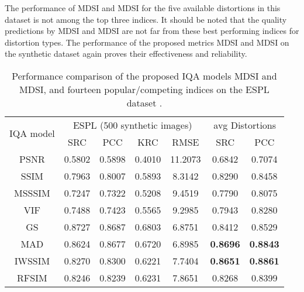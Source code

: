 The performance of MDSI and MDSI for the five available distortions in this dataset is not among the top three indices. It should be noted that the quality predictions by MDSI and MDSI are not far from these best performing indices for distortion types. The performance of the proposed metrics MDSI and MDSI on the synthetic dataset again proves their effectiveness and reliability.  


\begin{table}[htb]
\caption{Performance comparison of the proposed IQA models MDSI and MDSI, and fourteen popular/competing indices on the ESPL dataset \cite{ESPL}.}
\scriptsize
\centering
\begin{tabular}{c|cccc|cc}
\hline
\multirow{2}{*}{IQA model} & \multicolumn{4}{c|}{ESPL (500 synthetic images)}                                & \multicolumn{2}{c}{avg Distortions}                 \\ \cline{2-7} 
                           & SRC             & PCC             & KRC             & RMSE            & SRC             & PCC             \\ \hline
PSNR                       & 0.5802          & 0.5898          & 0.4010          & 11.2073         & 0.6842          & 0.7074          \\
SSIM \cite{SSIM}                       & 0.7963          & 0.8007          & 0.5893          & 8.3142          & 0.8290          & 0.8458          \\
MSSSIM \cite{MSSSIM}                     & 0.7247          & 0.7322          & 0.5208          & 9.4519          & 0.7790          & 0.8075          \\
VIF \cite{VIF}                       & 0.7488          & 0.7423          & 0.5565          & 9.2985          & 0.7943          & 0.8280          \\
GS \cite{GS}                         & 0.8727          & 0.8687          & 0.6803          & 6.8751          & 0.8412          & 0.8529          \\
MAD \cite{MAD}                        & 0.8624          & 0.8677 & 0.6720          & 6.8985          & \textbf{0.8696} & \textbf{0.8843} \\
IWSSIM \cite{IWSSIM}                     & 0.8270          & 0.8300          & 0.6221          & 7.7404          & \textbf{0.8651} & \textbf{0.8861} \\
RFSIM \cite{RFSIM}                      & 0.8246          & 0.8239 & 0.6231          & 7.8651          & 0.8268          & 0.8399 \\

\end{tabular}
\end{table}

